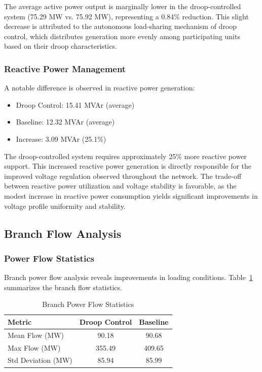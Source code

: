 The average active power output is marginally lower in the droop-controlled system (75.29 MW vs. 75.92 MW), representing a 0.84\% reduction. This slight decrease is attributed to the autonomous load-sharing mechanism of droop control, which distributes generation more evenly among participating units based on their droop characteristics.

\subsubsection{Reactive Power Management}

A notable difference is observed in reactive power generation:

\begin{itemize}
    \item Droop Control: 15.41 MVAr (average)
    \item Baseline: 12.32 MVAr (average)
    \item Increase: 3.09 MVAr (25.1\%)
\end{itemize}

The droop-controlled system requires approximately 25\% more reactive power support. This increased reactive power generation is directly responsible for the improved voltage regulation observed throughout the network. The trade-off between reactive power utilization and voltage stability is favorable, as the modest increase in reactive power consumption yields significant improvements in voltage profile uniformity and stability.

\subsection{Branch Flow Analysis}

\subsubsection{Power Flow Statistics}

Branch power flow analysis reveals improvements in loading conditions. Table~\ref{tab:branch_flow} summarizes the branch flow statistics.

\begin{table}[htbp]
\centering
\caption{Branch Power Flow Statistics}
\label{tab:branch_flow}
\begin{tabular}{lcc}
\hline
\textbf{Metric} & \textbf{Droop Control} & \textbf{Baseline} \\
\hline
Mean Flow (MW) & 90.18 & 90.68 \\
Max Flow (MW) & 355.49 & 409.65 \\
Std Deviation (MW) & 85.94 & 85.99 \\
\hline
\end{tabular}
\end{table}

